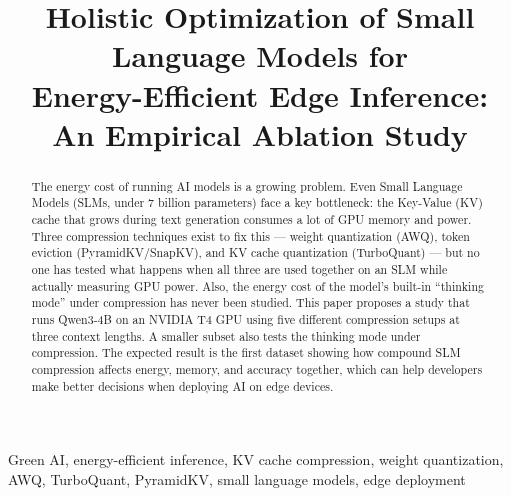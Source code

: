 \documentclass[conference]{IEEEtran}
\begin{document}
\title{Holistic Optimization of Small Language Models for\\Energy-Efficient Edge Inference:\\An Empirical Ablation Study}

\author{
  \and
  \and
}

\maketitle

\begin{abstract}
The energy cost of running AI models is a growing problem. Even Small Language Models (SLMs, under 7 billion parameters) face a key bottleneck: the Key-Value (KV) cache that grows during text generation consumes a lot of GPU memory and power. Three compression techniques exist to fix this --- weight quantization (AWQ), token eviction (PyramidKV/SnapKV), and KV cache quantization (TurboQuant) --- but no one has tested what happens when all three are used together on an SLM while actually measuring GPU power. Also, the energy cost of the model's built-in ``thinking mode'' under compression has never been studied. This paper proposes a study that runs Qwen3-4B on an NVIDIA T4 GPU using five different compression setups at three context lengths. A smaller subset also tests the thinking mode under compression. The expected result is the first dataset showing how compound SLM compression affects energy, memory, and accuracy together, which can help developers make better decisions when deploying AI on edge devices.
\end{abstract}

\begin{IEEEkeywords}
Green AI, energy-efficient inference, KV cache compression, weight quantization, AWQ, TurboQuant, PyramidKV, small language models, edge deployment
\end{IEEEkeywords}
\end{document}
